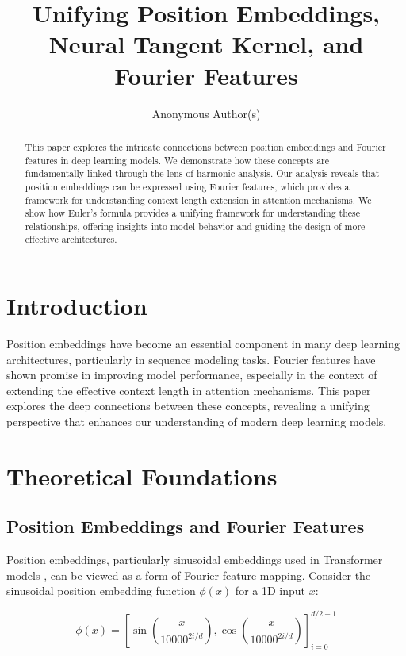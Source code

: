 \documentclass{article}
\title{Unifying Position Embeddings, Neural Tangent Kernel, and Fourier Features}
\author{Anonymous Author(s)}
\begin{document}
\maketitle

\begin{abstract}
This paper explores the intricate connections between position embeddings and Fourier features in deep learning models. We demonstrate how these concepts are fundamentally linked through the lens of harmonic analysis. Our analysis reveals that position embeddings can be expressed using Fourier features, which provides a framework for understanding context length extension in attention mechanisms. We show how Euler's formula provides a unifying framework for understanding these relationships, offering insights into model behavior and guiding the design of more effective architectures.
\end{abstract}

\section{Introduction}

Position embeddings have become an essential component in many deep learning architectures, particularly in sequence modeling tasks. Fourier features have shown promise in improving model performance, especially in the context of extending the effective context length in attention mechanisms. This paper explores the deep connections between these concepts, revealing a unifying perspective that enhances our understanding of modern deep learning models.

\section{Theoretical Foundations}

\subsection{Position Embeddings and Fourier Features}

Position embeddings, particularly sinusoidal embeddings used in Transformer models \citep{Vaswani2017}, can be viewed as a form of Fourier feature mapping. Consider the sinusoidal position embedding function $\phi(x)$ for a 1D input $x$:

\begin{equation}
    \phi(x) = \left[\sin\left(\frac{x}{10000^{2i/d}}\right), \cos\left(\frac{x}{10000^{2i/d}}\right)\right]_{i=0}^{d/2-1}
\end{equation}
\end{document}
